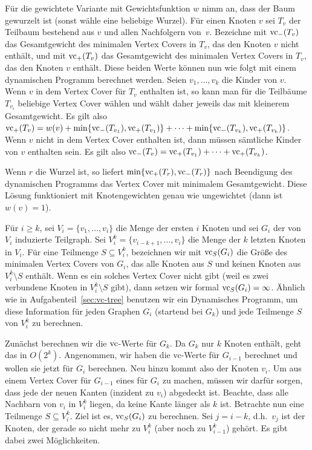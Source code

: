 Für die gewichtete Variante mit Gewichtsfunktion $w$ nimm an, dass der Baum gewurzelt ist
(sonst wähle eine beliebige Wurzel).  Für einen Knoten $v$ sei $T_v$
der Teilbaum bestehend aus $v$ und allen Nachfolgern von~$v$.
Bezeichne mit $\operatorname{vc}_-(T_v)$ das Gesamtgewicht des minimalen Vertex Covers in
$T_v$, das den Knoten $v$ nicht enthält, und mit $\operatorname{vc}_+(T_v)$ das Gesamtgewicht des minimalen Vertex Covers in
$T_v$, das den Knoten $v$ enthält.  Diese beiden Werte können nun wie
folgt mit einem dynamischen Programm berechnet werden.  Seien
$v_1, \dots, v_k$ die Kinder von $v$. 
Wenn $v$ in dem Vertex Cover für $T_v$ enthalten ist, so kann man für
die Teilbäume $T_{v_i}$ beliebige Vertex Cover wählen und wählt daher jeweils das mit kleinerem Gesamtgewicht.  Es gilt also
$\operatorname{vc}_+(T_v) = w(v) + \min\{\operatorname{vc}_-(T_{v_1}), \operatorname{vc}_+(T_{v_1})\} + \dots + \min\{\operatorname{vc}_-(T_{v_k}), \operatorname{vc}_+(T_{v_k})\}$.  Wenn $v$
nicht in dem Vertex Cover enthalten ist, dann müssen sämtliche
Kinder von $v$ enthalten sein.  Es gilt also
$\operatorname{vc}_-(T_v) = \operatorname{vc}_+(T_{v_1}) + \dots + \operatorname{vc}_+(T_{v_k})$.

Wenn $r$ die Wurzel ist, so liefert $\min\{\operatorname{vc}_+(T_r), \operatorname{vc}_-(T_r)\}$ nach
Beendigung des dynamischen Programms das Vertex Cover mit minimalem Gesamtgewicht.
Diese Lösung funktioniert mit Knotengewichten genau wie ungewichtet (dann ist $w(v) = 1$).

\subexercise
\label{sec:vc-path}

Für $i \ge k$, sei $V_i = \{v_1, \dots, v_i\}$ die Menge der ersten
$i$ Knoten und sei $G_i$ der von $V_i$ induzierte Teilgraph.  Sei
$V_i^k = \{v_{i-k+1}, \dots, v_i\}$ die Menge der $k$ letzten Knoten
in $V_i$.  Für eine Teilmenge $S \subseteq V_i^k$, bezeichnen wir mit
$\operatorname{vc}_S(G_i)$ die Größe des minimalen Vertex Covers von $G_i$, das alle Knoten
aus $S$ und keinen Knoten aus $V_i^k\setminus S$ enthält.  Wenn es ein
solches Vertex Cover nicht gibt (weil es zwei verbundene Knoten in
$V_i^k\setminus S$ gibt), dann setzen wir formal
$\operatorname{vc}_S(G_i) = \infty$.  Ähnlich wie in Aufgabenteil~\ref{sec:vc-tree}
benutzen wir ein Dynamisches Programm, um diese Information für jeden
Graphen $G_i$ (startend bei $G_k$) und jede Teilmenge $S$ von $V_i^k$
zu berechnen.

Zunächst berechnen wir die $\operatorname{vc}$-Werte für $G_k$.  Da $G_k$ nur $k$
Knoten enthält, geht das in $O(2^k)$.  Angenommen, wir haben die
vc-Werte für $G_{i-1}$ berechnet und wollen sie jetzt für $G_i$
berechnen.  Neu hinzu kommt also der Knoten $v_i$.  Um aus einem
Vertex Cover für $G_{i-1}$ eines für $G_i$ zu machen, müssen wir
darfür sorgen, dass jede der neuen Kanten (inzident zu $v_i$)
abgedeckt ist.  Beachte, dass alle Nachbarn von $v_i$ in $V_i^k$
liegen, da keine Kante länger als $k$ ist.  Betrachte nun eine
Teilmenge $S \subseteq V_i^k$.  Ziel ist es, $\operatorname{vc}_S(G_i)$ zu
berechnen.  Sei $j = i-k$, d.h.\ $v_j$ ist der Knoten, der gerade so
nicht mehr zu $V_i^k$ (aber noch zu $V_{i-1}^k$) gehört.  Es gibt
dabei zwei Möglichkeiten.

